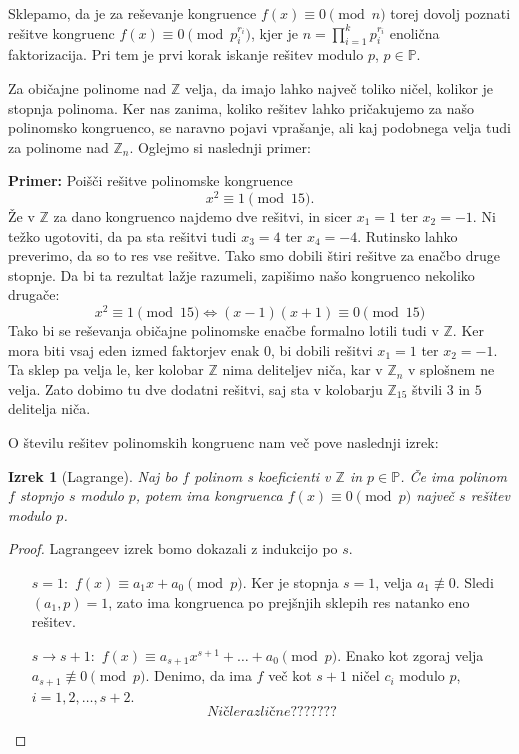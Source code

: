 \documentclass[12pt, a4paper]{article}
\newtheorem{izr}{Izrek}
\newenvironment{prim}[1][]{\par\medskip\noindent \textbf{Primer: }}{\medskip}
\begin{document}
Sklepamo, da je za reševanje kongruence $f(x)\equiv 0\pmod n$ torej dovolj poznati rešitve kongruenc $f(x)\equiv 0\pmod{p_{i}^{r_{i}}}$, kjer je $n=\prod_{i=1}^{k}p_{i}^{r_{i}}$ enolična faktorizacija. Pri tem je prvi korak iskanje rešitev modulo $p$, $p\in \mathbb{P}$. 

Za običajne polinome nad $\mathbb{Z}$ velja, da imajo lahko največ toliko ničel, kolikor je stopnja polinoma. Ker nas zanima, koliko rešitev lahko pričakujemo za našo polinomsko kongruenco, se naravno pojavi vprašanje, ali kaj podobnega velja tudi za polinome nad $\mathbb{Z}_{n}$. Oglejmo si naslednji primer:

\begin{prim}
Poišči rešitve polinomske kongruence
$$x^{2}\equiv 1\pmod{15}.$$
Že v $\mathbb{Z}$ za dano kongruenco najdemo dve rešitvi, in sicer $x_{1}=1$ ter $x_{2}=-1$. Ni težko ugotoviti, da pa sta rešitvi tudi $x_{3}=4$ ter $x_{4}=-4$. Rutinsko lahko preverimo, da so to res vse rešitve. Tako smo dobili štiri rešitve za enačbo druge stopnje. Da bi ta rezultat lažje razumeli, zapišimo našo kongruenco nekoliko drugače:
$$x^{2}\equiv 1\pmod{15} \iff (x-1)(x+1)\equiv 0 \pmod{15}$$
Tako bi se reševanja običajne polinomske enačbe formalno lotili tudi v $\mathbb{Z}$. Ker mora biti vsaj eden izmed faktorjev enak $0$, bi dobili rešitvi $x_{1}=1$ ter $x_{2}=-1$. Ta sklep pa velja le, ker kolobar $\mathbb{Z}$ nima deliteljev niča, kar v $\mathbb{Z}_{n}$ v splošnem ne velja. Zato dobimo tu dve dodatni rešitvi, saj sta v kolobarju $\mathbb{Z}_{15}$ štvili $3$ in $5$ delitelja niča.
\end{prim}

O številu rešitev polinomskih kongruenc nam več pove naslednji izrek:

\begin{izr}[Lagrange]
Naj bo $f$ polinom s koeficienti v $\mathbb{Z}$ in $p\in \mathbb{P}$. Če ima polinom $f$ stopnjo $s$ modulo $p$, potem ima kongruenca $f(x)\equiv 0\pmod p$ največ $s$ rešitev modulo $p$.
\end{izr}

\begin{proof}
Lagrangeev izrek bomo dokazali z indukcijo po $s$.
\begin{itemize}
\item[$s=1:$] $f(x)\equiv a_{1}x+a_{0} \pmod p$. Ker je stopnja $s=1$, velja $a_{1}\not\equiv 0$. Sledi $(a_{1},p)=1$, zato ima kongruenca po prejšnjih sklepih res natanko eno rešitev. \checkmark
\item[$s\rightarrow s+1:$] $f(x)\equiv a_{s+1}x^{s+1}+\dots + a_{0} \pmod p$. Enako kot zgoraj velja $a_{s+1}\not\equiv 0 \pmod p$. Denimo, da ima $f$ več kot $s+1$ ničel $c_{i}$ modulo $p$, $i=1,2,\dots ,s+2$. $$Ničle različne???????$$

\end{itemize}
\end{proof}
\end{document}
